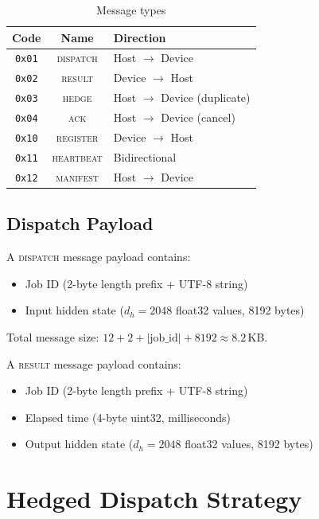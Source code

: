 \documentclass[11pt,a4paper]{article}
\begin{document}
\begin{table}[h]
\centering
\caption{Message types}
\label{tab:types}
\begin{tabular}{@{}ccl@{}}
\toprule
Code & Name & Direction \\
\midrule
\texttt{0x01} & \textsc{dispatch} & Host $\to$ Device \\
\texttt{0x02} & \textsc{result} & Device $\to$ Host \\
\texttt{0x03} & \textsc{hedge} & Host $\to$ Device (duplicate) \\
\texttt{0x04} & \textsc{ack} & Host $\to$ Device (cancel) \\
\texttt{0x10} & \textsc{register} & Device $\to$ Host \\
\texttt{0x11} & \textsc{heartbeat} & Bidirectional \\
\texttt{0x12} & \textsc{manifest} & Host $\to$ Device \\
\bottomrule
\end{tabular}
\end{table}

\subsection{Dispatch Payload}

A \textsc{dispatch} message payload contains:
\begin{itemize}
  \item Job ID (2-byte length prefix + UTF-8 string)
  \item Input hidden state ($d_h = 2048$ float32 values, 8192 bytes)
\end{itemize}

Total message size: $12 + 2 + |\text{job\_id}| + 8192 \approx 8.2$\,KB.

A \textsc{result} message payload contains:
\begin{itemize}
  \item Job ID (2-byte length prefix + UTF-8 string)
  \item Elapsed time (4-byte uint32, milliseconds)
  \item Output hidden state ($d_h = 2048$ float32 values, 8192 bytes)
\end{itemize}

\section{Hedged Dispatch Strategy}
\label{sec:hedge}
\end{document}
